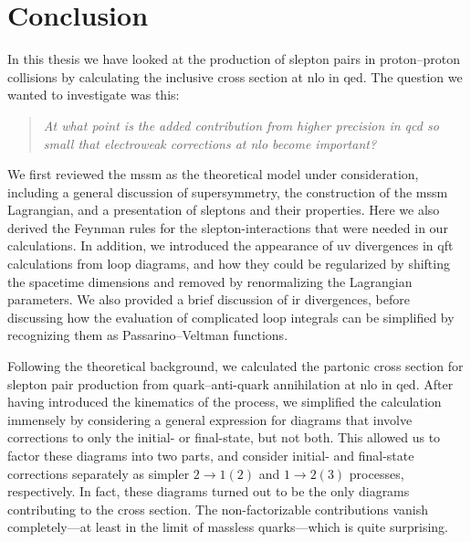 \chapter*{Conclusion}

In this thesis we have looked at the production of slepton pairs in proton--proton collisions by calculating the inclusive cross section at \gls{nlo} in \gls{qed}.
The question we wanted to investigate was this:
\begin{quote}
    \textit{At what point is the added contribution from higher precision in \gls{qcd} so small that electroweak corrections at \gls{nlo} become important?}
\end{quote}

We first reviewed the \gls{mssm} as the theoretical model under consideration, including a general discussion of supersymmetry, the construction of the \gls{mssm} Lagrangian, and a presentation of sleptons and their properties.
Here we also derived the Feynman rules for the slepton-interactions that were needed in our calculations.
In addition, we introduced the appearance of \gls{uv} divergences in \gls{qft} calculations from loop diagrams, and how they could be regularized by shifting the spacetime dimensions and removed by renormalizing the Lagrangian parameters. We also provided a brief discussion of \gls{ir} divergences, before discussing how the evaluation of complicated loop integrals can be simplified by recognizing them as Passarino--Veltman functions.

Following the theoretical background, we calculated the partonic cross section for slepton pair production from quark--anti-quark annihilation at \gls{nlo} in \gls{qed}.
After having introduced the kinematics of the process, we simplified the calculation immensely by considering a general expression for diagrams that involve corrections to only the initial- or final-state, but not both.
This allowed us to factor these diagrams into two parts, and consider initial- and final-state corrections separately as simpler $2\to1(2)$ and $1\to2(3)$ processes, respectively.
In fact, these diagrams turned out to be the only diagrams contributing to the cross section. The non-factorizable contributions vanish completely---at least in the limit of massless quarks---which is quite surprising.

